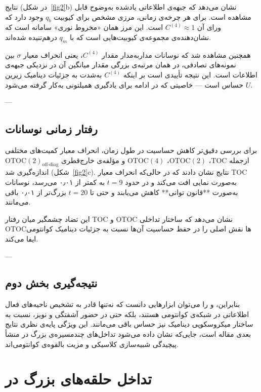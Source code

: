 نتایج (در شکل~\ref{fig2}b) نشان می‌دهد که جبهه‌ی اطلاعاتی یادشده به‌وضوح قابل مشاهده است. برای هر چرخه‌ی زمانی، مرزی مشخص برای کیوبیت \( q_b \) وجود دارد که ورای آن \( C^{(4)} \approx 1 \) است. این مرز همان «مخروط نوری» سامانه است که نشان‌دهنده‌ی مجموعه‌ی کیوبیت‌هایی است که با \( q_m \) درهم‌تنیده شده‌اند.

همچنین مشاهده شد که نوسانات مدار‌به‌مدار مقدار \( C^{(4)} \)، یعنی انحراف معیار \(\sigma\) بین نمونه‌های تصادفی، در همان مرتبه‌ی بزرگی مقدار میانگین آن در نزدیکی جبهه‌ی اطلاعات است. این نتیجه تأییدی است بر اینکه \( C^{(4)} \) به‌شدت به جزئیات دینامیک زیرین \( U \) حساس است — خاصیتی که در ادامه برای یادگیری همیلتونی به‌کار گرفته می‌شود.

---

\subsection{رفتار زمانی نوسانات}

برای بررسی دقیق‌تر کاهش حساسیت در طول زمان، انحراف معیار کمیت‌های مختلفی ازجمله \(\mathrm{TOC}\)، \(\mathrm{OTOC(2)}\)، \(\mathrm{OTOC(4)}\) و مؤلفه‌ی خارج‌قطری \(\mathrm{OTOC(2)}_{\text{off-diag}}\) اندازه‌گیری شد (شکل~\ref{fig2}c).  
نتایج نشان دادند که در حالی‌که انحراف معیار TOC به‌صورت نمایی افت می‌کند و در حدود \(t = 9\) به کمتر از ۰٫۰۱ می‌رسد، نوسانات  به‌صورت **قانون توانی** کاهش می‌یابند و حتی تا \(t = 20\) بزرگ‌تر از ۰٫۰۱ باقی می‌مانند.

این تضاد چشمگیر میان رفتار TOC و OTOC نشان می‌دهد که ساختار تداخلی OTOCها نقش اصلی را در حفظ حساسیت آن‌ها نسبت به جزئیات دینامیک کوانتومی ایفا می‌کند.

---

\subsection{نتیجه‌گیری بخش دوم}

بنابراین،  و  را می‌توان ابزارهایی دانست که نه‌تنها قادر به تشخیص ناحیه‌های فعال اطلاعاتی در شبکه‌ی کوانتومی هستند، بلکه حتی در حضور آشفتگی و نویز، نسبت به ساختار میکروسکوپی دینامیک نیز حساس باقی می‌مانند. این ویژگی پایه‌ی نظری نتایج بعدی مقاله است، جایی‌که نشان داده می‌شود تداخل‌های چندمسیره‌ی بزرگ در  منشأ پیچیدگی شبیه‌سازی کلاسیکی و مزیت بالقوه‌ی کوانتومی‌اند.
\section{تداخل حلقه‌های بزرگ در }
\label{sec:large-loop}

